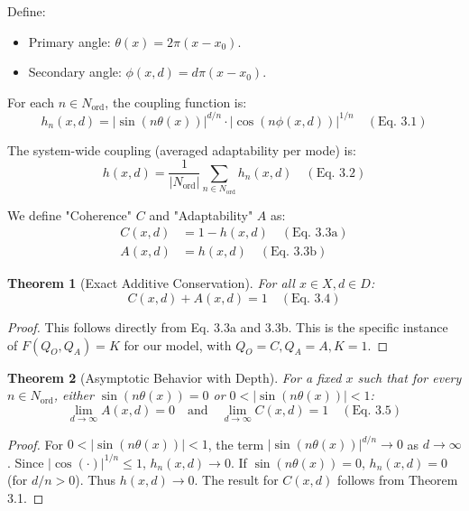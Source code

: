 \documentclass[11pt,a4paper]{article}
\newtheorem{theorem}{Theorem}[section]
\begin{document}
Define:
\begin{itemize}
    \item Primary angle: $\theta(x) = 2\pi(x - x_0)$.
    \item Secondary angle: $\phi(x,d) = d\pi(x - x_0)$.
\end{itemize}

For each $n \in N_{\text{ord}}$, the coupling function is:
\begin{equation}
    h_n(x,d) = |\sin(n\theta(x))|^{d/n} \cdot |\cos(n\phi(x,d))|^{1/n} \quad (\text{Eq. 3.1})
\end{equation}

The system-wide coupling (averaged adaptability per mode) is:
\begin{equation}
    h(x,d) = \frac{1}{|N_{\text{ord}}|} \sum_{n \in N_{\text{ord}}} h_n(x,d) \quad (\text{Eq. 3.2})
\end{equation}

We define "Coherence" $C$ and "Adaptability" $A$ as:
\begin{align}
    C(x,d) &= 1 - h(x,d) \quad (\text{Eq. 3.3a})\\
    A(x,d) &= h(x,d) \quad (\text{Eq. 3.3b})
\end{align}

\begin{theorem}[Exact Additive Conservation]
For all $x \in X, d \in D$:
\begin{equation}
    C(x,d) + A(x,d) = 1 \quad (\text{Eq. 3.4})
\end{equation}
\end{theorem}

\begin{proof}
This follows directly from Eq. 3.3a and 3.3b. This is the specific instance of $F(Q_O, Q_A)=K$ for our model, with $Q_O=C, Q_A=A, K=1$.
\end{proof}

\begin{theorem}[Asymptotic Behavior with Depth]
For a fixed $x$ such that for every $n \in N_{\text{ord}}$, either $\sin(n\theta(x))=0$ or $0 < |\sin(n\theta(x))|<1$:
\begin{equation}
    \lim_{d \to \infty} A(x,d) = 0 \quad \text{and} \quad \lim_{d \to \infty} C(x,d) = 1 \quad (\text{Eq. 3.5})
\end{equation}
\end{theorem}

\begin{proof}
For $0 < |\sin(n\theta(x))|<1$, the term $|\sin(n\theta(x))|^{d/n} \to 0$ as $d \to \infty$. Since $|\cos(\cdot)|^{1/n} \le 1$, $h_n(x,d) \to 0$. If $\sin(n\theta(x))=0$, $h_n(x,d)=0$ (for $d/n >0$). Thus $h(x,d) \to 0$. The result for $C(x,d)$ follows from Theorem 3.1.
\end{proof}
\end{document}
